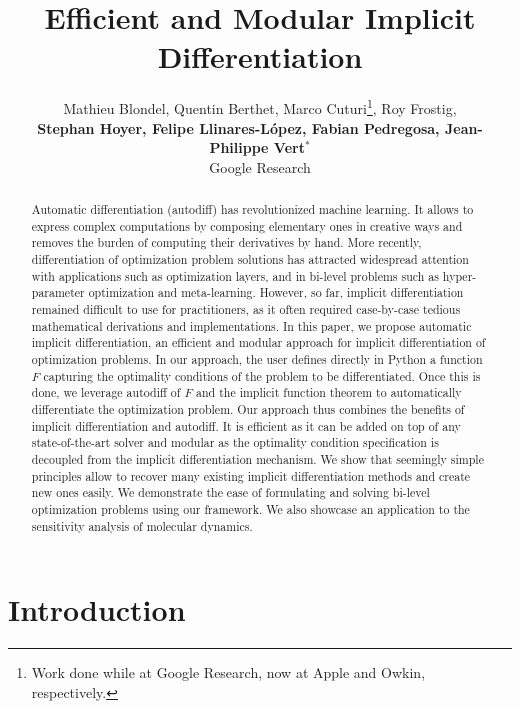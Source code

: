 \documentclass{article}
\title{\Large{Efficient and Modular Implicit Differentiation}}
\author{%
    Mathieu Blondel,
    Quentin Berthet,
    Marco Cuturi\thanks{Work done while at Google Research, now at Apple and
    Owkin, respectively.},
    Roy Frostig, \\
    {\bf Stephan Hoyer,
    Felipe Llinares-L\'{o}pez,
    Fabian Pedregosa,
    Jean-Philippe Vert$^\ast$} \\
    \textnormal{Google Research}
}
\begin{document}
\maketitle

\begin{abstract}
Automatic differentiation (autodiff) has revolutionized machine learning.  It
allows to express complex computations by composing elementary ones in creative
ways and removes the burden of computing their derivatives by hand. More
recently, differentiation of optimization problem solutions has attracted
widespread attention with applications such as optimization layers, and in
bi-level problems such as hyper-parameter optimization and meta-learning.
However, so far, implicit differentiation remained difficult to use for
practitioners, as it often required case-by-case tedious mathematical
derivations and implementations. In this paper, we propose
automatic implicit differentiation, an efficient
and modular approach for implicit differentiation of optimization problems. In
our approach, the user defines directly in Python a function $F$ capturing the
optimality conditions of the problem to be differentiated. Once this is done, we
leverage autodiff of $F$ and the implicit function theorem to automatically
differentiate the optimization problem.  Our approach thus combines the benefits
of implicit differentiation and autodiff.  It is efficient as it can be added on
top of any state-of-the-art solver and modular as the optimality condition
specification is decoupled from the implicit differentiation mechanism.  We show
that seemingly simple principles allow to recover many existing implicit
differentiation methods and create new ones easily.  We demonstrate the ease of
formulating and solving bi-level optimization problems using our framework. We
also showcase an application to the sensitivity analysis of molecular dynamics.
\end{abstract}

\section{Introduction}
\end{document}

